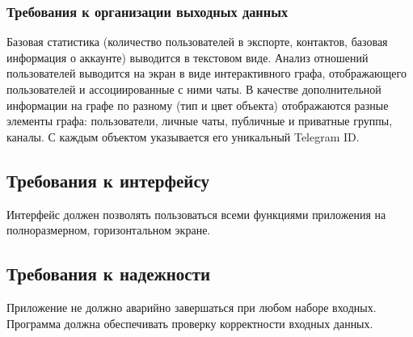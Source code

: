 \subsubsection{Требования к организации выходных данных}

Базовая статистика (количество пользователей в экспорте, контактов, базовая информация о аккаунте) выводится в текстовом виде.
Анализ отношений пользователей выводится на экран в виде интерактивного графа, отображающего пользователей и ассоциированные с ними чаты.
В качестве дополнительной информации на графе по разному (тип и цвет объекта) отображаются разные элементы графа: пользователи, личные чаты, публичные и приватные группы, каналы.
С каждым объектом указывается его уникальный Telegram ID.

\subsection{Требования к интерфейсу}

Интерфейс должен позволять пользоваться всеми функциями приложения на полноразмерном, горизонтальном экране.

\subsection{Требования к надежности}

Приложение не должно аварийно завершаться при любом наборе входных. 
Программа должна обеспечивать проверку корректности входных данных.